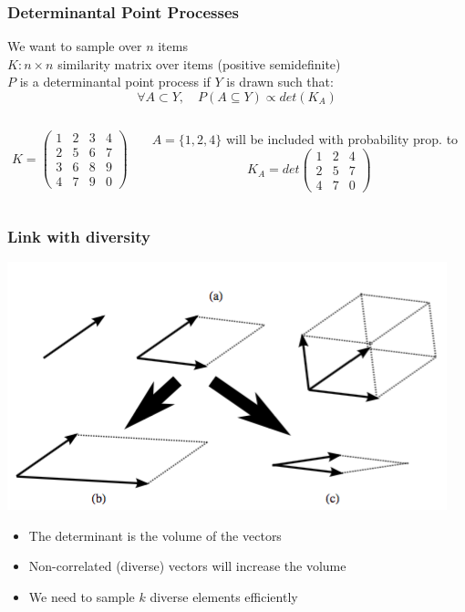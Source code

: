 \documentclass[handout]{beamer}
\begin{document}
\begin{frame}
    \frametitle{Determinantal Point Processes}
    We want to sample over $n$ items\\
    $K : n \times n$ \alert{similarity matrix} over items (positive semidefinite)\\[5mm]
    $P$ is a \alert{determinantal point process} if $Y$ is drawn such that:
    \[ \forall A \subset Y, \quad P(A \subseteq Y) \propto det(K_A) \]
    \begin{example}
    \begin{columns}
    \begin{column}{0.5\textwidth}
    \[ K = \left(\begin{array}{cccc}
    1 & 2 & 3 & 4\\
    2 & 5 & 6 & 7\\
    3 & 6 & 8 & 9\\
    4 & 7 & 9 & 0
    \end{array}\right) \]
    \end{column}
    \begin{column}{0.5\textwidth}
    $A = \{1, 2, 4\}$ will be included with probability prop. to
    \[ K_A = det\left(\begin{array}{ccc}
    1 & 2 & 4\\
    2 & 5 & 7\\
    4 & 7 & 0
    \end{array}\right) \]
    \end{column}
    \end{columns}
    \end{example}
\end{frame}

\begin{frame}
    \frametitle{Link with diversity}
    \centering
    \includegraphics[width=0.7\linewidth]{figures/vol.png}
    \begin{itemize}
    \item The determinant is the volume of the vectors
    \item Non-correlated (\alert{diverse}) vectors will increase the volume
    \item We need to sample $k$ diverse elements efficiently
    \end{itemize}
\end{frame}
\end{document}
